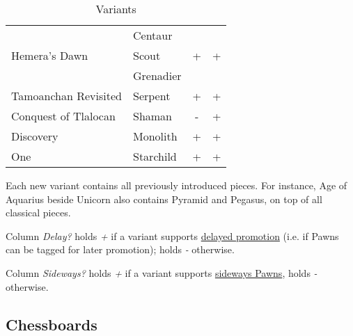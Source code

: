 \begin{table}[!h]
\begin{tabular}{ llcc }
\multirow{3}{*}{Hemera's Dawn}   & Centaur           & \multirow{3}{*}{+}   & \multirow{3}{*}{+}   \\
                                 & Scout             &                      &                      \\
                                 & Grenadier         &                      &                      \\
\cmidrule{1-4} %
Tamoanchan Revisited             & Serpent           & +                    & +                    \\
Conquest of Tlalocan             & Shaman            & -                    & +                    \\
Discovery                        & Monolith          & +                    & +                    \\
One                              & Starchild         & +                    & +                    \\
\bottomrule %
\end{tabular}
\caption{Variants}
\label{tbl:Appendix/Introduction/Variants}
\end{table}

Each new variant contains all previously introduced pieces. For instance, Age of
Aquarius beside Unicorn also contains Pyramid and Pegasus, on top of all classical
pieces.

Column \emph{Delay?} holds \emph{+} if a variant supports
\hyperref[sec:Age of Aquarius/Promotion]{delayed promotion}
(i.e. if Pawns can be tagged for later promotion); holds \emph{-} otherwise.

Column \emph{Sideways?} holds \emph{+} if a variant supports
\hyperref[sec:Nineteen/Sideways Pawns]{sideways Pawns}, holds \emph{-} otherwise.

\clearpage %

\subsection*{Chessboards}
\label{sec:Appendix/Introduction/Chessboards}

